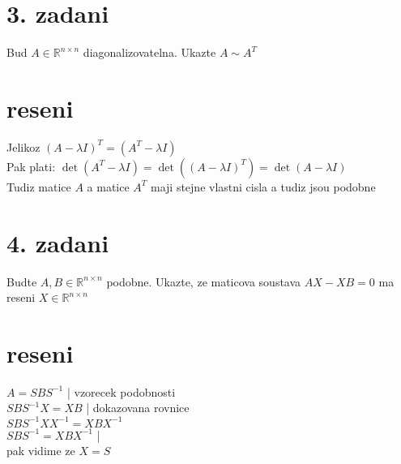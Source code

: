 \documentclass[a4paper]{article}
\begin{document}
\section*{3. zadani}
Bud $A\in \mathbb{R}^{n\times n}$ diagonalizovatelna. Ukazte $A \sim A^T$

\section*{reseni}
Jelikoz $(A - \lambda I)^T = (A^T - \lambda I)$\\
Pak plati: $\det(A^T - \lambda I) = \det((A - \lambda I)^T)=\det(A-\lambda I)$ \\
Tudiz matice $A$ a matice $A^T$ maji stejne vlastni cisla a tudiz jsou podobne










\section*{4. zadani}
Budte $A, B \in\mathbb{R}^{n\times n}$ podobne.
Ukazte, ze maticova soustava $AX - XB = 0$
ma reseni $X\in\mathbb{R}^{n\times n}$

\section*{reseni}
$A=SBS^{-1}$ | vzorecek podobnosti\\
$SBS^{-1}X = XB$ | dokazovana rovnice\\
$SBS^{-1}XX^{-1} = XBX^{-1}$\\
$SBS^{-1} = XBX^{-1}$ | \\
pak vidime ze $X=S$
\end{document}

